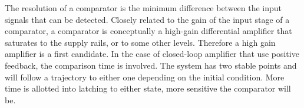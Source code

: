 The resolution of a comparator is the minimum difference between the input signals that can be detected. Closely related to the gain of the input stage of a comparator, a comparator is conceptually a high-gain differential amplifier that saturates to the supply rails, or to some other levels. Therefore a high gain amplifier is a first candidate. In the case of closed-loop amplifier that use positive feedback, the comparison time is involved. The system has two stable points and will follow a trajectory to either one depending on the initial condition. More time is allotted into latching to either state, more sensitive the comparator will be.





